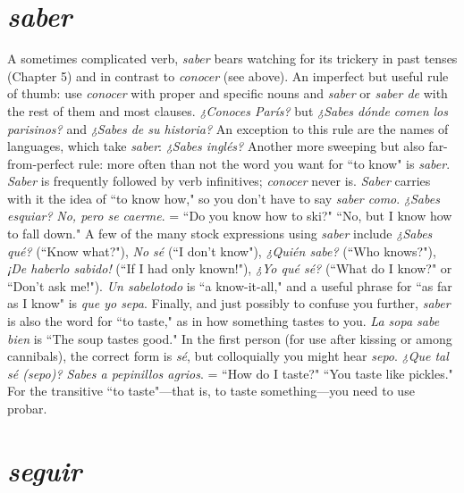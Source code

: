 \section{\emph{saber}}

A sometimes complicated verb, \emph{saber} bears watching for its
trickery in past tenses (Chapter 5) and in contrast to \emph{conocer} (see
above). An imperfect but useful rule of thumb: use \emph{conocer} with
proper and specific nouns and \emph{saber} or \emph{saber de} with the rest of them
and most clauses. \emph{¿Conoces París?} but \emph{¿Sabes dónde comen los parisinos?} and \emph{¿Sabes de su historia?} An exception to this rule are the
names of languages, which take \emph{saber}: \emph{¿Sabes inglés?} Another more
sweeping but also far-from-perfect rule: more often than not the word
you want for ``to know" is \emph{saber}. \emph{Saber} is frequently followed by verb
infinitives; \emph{conocer} never is. \emph{Saber} carries with it the idea of ``to know
how," so you don't have to say \emph{saber como}. \emph{¿Sabes esquiar?} \emph{No, pero
	se caerme}. = ``Do you know how to ski?" ``No, but I know how to
fall down."
A few of the many stock expressions using \emph{saber} include
\emph{¿Sabes qué?} (``Know what?"), \emph{No sé} (``I don't know"), \emph{¿Quién sabe?}
(``Who knows?"), \emph{¡De haberlo sabido!} (``If I had only known!"), \emph{¿Yo
	qué sé?} (``What do I know?" or ``Don't ask me!"). \emph{Un sabelotodo} is ``a
know-it-all," and a useful phrase for ``as far as I know" is \emph{que yo sepa}.
Finally, and just possibly to confuse you further, \emph{saber} is also
the word for ``to taste," as in how something tastes to you. \emph{La sopa
	sabe bien} is ``The soup tastes good." In the first person (for use after
kissing or among cannibals), the correct form is \emph{sé}, but colloquially
you might hear \emph{sepo}. \emph{¿Que tal sé (sepo)? Sabes a pepinillos agrios}.
= ``How do I taste?" ``You taste like pickles." For the transitive ``to
taste"---that is, to taste something---you need to use probar.

\section{\emph{seguir}}

